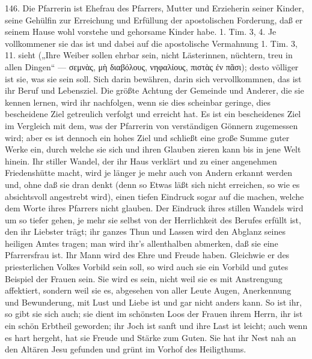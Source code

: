 146. Die Pfarrerin ist Ehefrau des Pfarrers, Mutter und Erzieherin seiner Kinder, seine Gehülfin zur Erreichung und Erfüllung der apostolischen Forderung, daß er seinem Hause wohl vorstehe und gehorsame Kinder habe. 1. Tim. 3, 4. Je vollkommener sie das ist und dabei auf die apostolische Vermahnung 1. Tim. 3, 11. sieht („Ihre Weiber sollen ehrbar sein, nicht Lästerinnen, nüchtern, treu in allen Dingen“ — σεμνὰς, μὴ διαβόλους, νηφαλίους, πιστὰς ἐν πᾶσι); desto völliger ist sie, was sie sein soll. Sich darin bewähren, darin sich vervollkommnen, das ist ihr Beruf und Lebensziel. Die größte Achtung
der Gemeinde und Anderer, die sie kennen lernen, wird ihr nachfolgen, wenn sie dies scheinbar geringe, dies bescheidene Ziel getreulich verfolgt und erreicht hat. Es ist ein bescheidenes Ziel im Vergleich mit dem, was der Pfarrerin von verständigen Gönnern zugemessen wird; aber es ist dennoch ein hohes Ziel und schließt eine große Summe guter Werke ein, durch welche sie sich und ihren Glauben zieren kann bis in jene Welt hinein. Ihr stiller Wandel, der ihr Haus verklärt und zu einer angenehmen Friedenshütte macht, wird je länger je mehr auch von Andern erkannt werden und, ohne daß sie dran denkt (denn so Etwas läßt sich nicht erreichen, so wie es absichtsvoll angestrebt wird), einen tiefen Eindruck sogar auf die machen, welche dem Worte ihres Pfarrers nicht glauben. Der Eindruck ihres stillen Wandels wird um so tiefer gehen, je mehr sie selbst von der Herrlichkeit des Berufes erfüllt ist, den ihr Liebster trägt; ihr ganzes Thun und Lassen wird den Abglanz seines heiligen Amtes tragen; man wird ihr’s allenthalben abmerken, daß sie eine Pfarrersfrau ist. Ihr Mann wird des Ehre und Freude haben. Gleichwie er des priesterlichen Volkes Vorbild sein soll, so wird auch sie ein Vorbild und gutes Beispiel der Frauen sein. Sie wird es sein, nicht weil sie es mit Anstrengung affektiert, sondern weil sie es, abgesehen von aller Leute Augen, Anerkennung und Bewunderung, mit Lust und Liebe ist und gar nicht anders kann. So ist ihr, so gibt sie sich auch; sie dient im schönsten Loos der Frauen ihrem Herrn, ihr ist ein schön Erbtheil geworden; ihr Joch ist sanft und ihre Last ist leicht; auch wenn es hart hergeht,
hat sie Freude und Stärke zum Guten. Sie hat ihr Nest nah an den Altären Jesu gefunden und grünt im Vorhof des Heiligthums.

